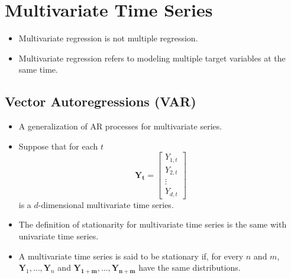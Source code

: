 \documentclass[11pt]{article}
\begin{document}
\section{Multivariate Time Series}
\begin{itemize}
    \item Multivariate regression is not multiple regression.
    \item Multivariate regression refers to modeling multiple target variables at the same time. 
\end{itemize}

\subsection{Vector Autoregressions (VAR)}
\begin{itemize}
    \item A generalization of AR processes for multivariate series. 
    \item Suppose that for each $t$ 
        \[ 
        \boldsymbol{Y_t} = 
        \begin{bmatrix}
            Y_{1,t} \\
            Y_{2,t} \\
            \vdots \\
            Y_{d,t}
        \end{bmatrix}
        \]
    is a $d$-dimensional multivariate time series. 
    \item The definition of stationarity for multivariate time series is the same with 
    univariate time series.
    \item A multivariate time series is said to be stationary if, for every $n$ and $m$, 
    $\boldsymbol{Y}_1, \ldots, \boldsymbol{Y}_n$ and $\boldsymbol{Y_{1+m}}, \ldots, 
    \boldsymbol{Y_{n+m}}$ have the same distributions. 
\end{itemize}
\end{document}
